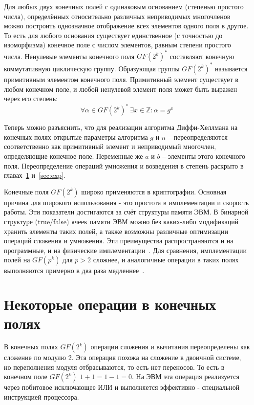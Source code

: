 \documentclass[times,specification,annotation]{itmo-student-thesis}
\begin{document}
Для любых двух конечных полей с одинаковым основанием (степенью простого числа), определённых относительно различных
неприводимых многочленов можно построить однозначное отображение всех элементов одного поля в другое.
То есть для любого основания существует единственное (с точностью до изоморфизма) конечное поле с числом
элементов, равным степени простого числа.
Ненулевые элементы конечного поля $GF(2^k)^*$ составляют конечную коммутативную циклическую группу.
Образующая группы $GF(2^k)^*$ называется примитивным элементом конечного поля.
Примитивный элемент существует в любом конечном поле, и любой ненулевой элемент поля может быть выражен через его степень:
\[\forall \alpha \in GF(2^k)^* ~ \exists x \in \mathbb{Z}: \alpha = g^x\]

Теперь можно разъяснить, что для реализации алгоритма Диффи-Хеллмана на конечных полях открытые параметры алгоритма
$g$ и $n$ -- переопределяются соответственно как примитивный элемент и неприводимый многочлен, определяющие конечное поле.
Переменные же $a$ и $b$ -- элементы этого конечного поля.
Переопределение операций умножения и возведения в степень раскрыто в главах~\ref{sec:oper} и~\ref{sec:exp}.

Конечные поля $GF(2^k)$ широко применяются в криптографии.
Основная причина для широкого использования - это простота в имплементации и скорость работы.
Эти показатели достигаются за счёт структуры памяти ЭВМ.
В бинарной структуре (true/false) ячеек памяти ЭВМ можно без каких-либо модификаций хранить элементы
таких полей, а также возможны различные оптимизации операций сложения и умножения.
Эти преимущества распространяются и на программные, и на физические имплементации~\cite{koc98}.
Для сравнения, имплементации полей на $GF(p^k)$ для $p > 2$ сложнее, и аналогичные операции в таких полях выполняются
примерно в два раза медленнее~\cite{mau15}.


\section{Некоторые операции в конечных полях}\label{sec:oper}

В конечных полях $GF(2^k)$ операции сложения и вычитания переопределены как сложение по модулю $2$.
Эта операция похожа на сложение в двоичной системе, но переполнения модуля отбрасываются, то есть нет переносов.
То есть в конечном поле $GF(2^k)$ $1+1 = 1-1 = 0$.
На ЭВМ эта операция реализуется через побитовое исключающее ИЛИ и выполняется эффективно - специальной инструкцией процессора.
\end{document}
